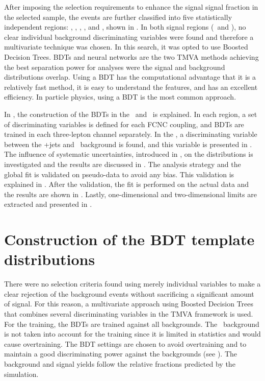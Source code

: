 After imposing the selection requirements  to enhance the signal signal fraction in the selected sample, the events are further classified into five statistically independent regions: \STSR, \TTSR, \WZCR, \STCR, and \TTCR, shown in . In both signal regions (\STSR\ and \TTSR), no clear individual background discriminating variables were found and therefore a multivariate technique was chosen. In this search, it was opted to use Boosted Decision Trees. BDTs and neural networks are the two TMVA methods achieving the best separation power for analyses were the signal and background distributions overlap. Using a BDT has the computational advantage that it is a relatively fast method, it is easy to understand the features,  and has an excellent efficiency. In particle physics, using a  BDT is the most common approach. 

In , the construction of the BDTs in the \STSR\ and \TTSR\ is explained. In each region, a set of discriminating variables is defined for each FCNC coupling, and BDTs are trained in each three-lepton channel separately. In the \WZCR, a discriminating variable between the \WZ+jets and \NPL\ background is found, and this variable is presented in . The influence of systematic uncertainties, introduced in , on the distributions is investigated and the results are discussed in . The analysis strategy and the global fit is validated on pseudo-data to avoid any bias. This validation is explained in . After the validation, the fit is performed on the actual data and the results are shown in . Lastly, one-dimensional and two-dimensional limits are extracted and presented in .


\section{Construction of the BDT template distributions}
\label{sec:templates}
There were no selection criteria found using merely individual variables to make a clear rejection of the background events without sacrificing a significant amount of signal. For this reason, a multivariate approach using Boosted Decision Trees that combines several discriminating variables in the TMVA framework is used. For the training, the BDTs are trained against all backgrounds.  The \NPL\ background is not taken into account for the training since it is limited in statistics and would cause overtraining. The BDT settings are chosen to avoid overtraining and to maintain a good discriminating power against the backgrounds (see ). The background and signal yields follow the relative fractions predicted by the simulation. 

